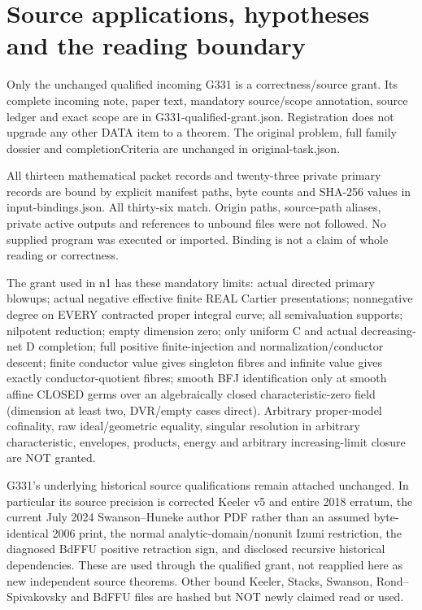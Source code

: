 \documentclass[11pt]{article}
\begin{document}
\section{Source applications, hypotheses and the reading boundary}

Only the unchanged qualified incoming G331 is a correctness/source grant. Its complete incoming note, paper text, mandatory source/scope annotation, source ledger and exact scope are in G331-qualified-grant.json. Registration does not upgrade any other DATA item to a theorem. The original problem, full family dossier and completionCriteria are unchanged in original-task.json.

All thirteen mathematical packet records and twenty-three private primary records are bound by explicit manifest paths, byte counts and SHA-256 values in input-bindings.json. All thirty-six match. Origin paths, source-path aliases, private active outputs and references to unbound files were not followed. No supplied program was executed or imported. Binding is not a claim of whole reading or correctness.

The grant used in n1 has these mandatory limits: actual directed primary blowups; actual negative effective finite REAL Cartier presentations; nonnegative degree on EVERY contracted proper integral curve; all semivaluation supports; nilpotent reduction; empty dimension zero; only uniform C and actual decreasing-net D completion; full positive finite-injection and normalization/conductor descent; finite conductor value gives singleton fibres and infinite value gives exactly conductor-quotient fibres; smooth BFJ identification only at smooth affine CLOSED germs over an algebraically closed characteristic-zero field (dimension at least two, DVR/empty cases direct). Arbitrary proper-model cofinality, raw ideal/geometric equality, singular resolution in arbitrary characteristic, envelopes, products, energy and arbitrary increasing-limit closure are NOT granted.

G331's underlying historical source qualifications remain attached unchanged. In particular its source precision is corrected Keeler v5 and entire 2018 erratum, the current July 2024 Swanson--Huneke author PDF rather than an assumed byte-identical 2006 print, the normal analytic-domain/nonunit Izumi restriction, the diagnosed BdFFU positive retraction sign, and disclosed recursive historical dependencies. These are used through the qualified grant, not reapplied here as new independent source theorems. Other bound Keeler, Stacks, Swanson, Rond--Spivakovsky and BdFFU files are hashed but NOT newly claimed read or used.
\end{document}

